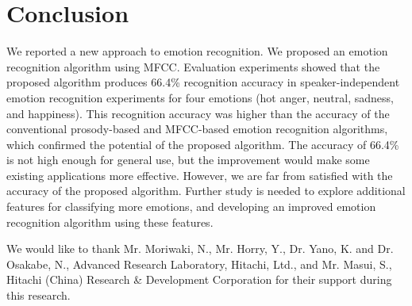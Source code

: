 \documentclass[english]{jnlp_1.3e}
\begin{document}
\section{Conclusion}

We reported a new approach to emotion recognition. We proposed an emotion recognition algorithm using MFCC. Evaluation experiments showed that the proposed algorithm produces 66.4\% recognition accuracy in speaker-independent emotion recognition experiments for four emotions (hot anger, neutral, sadness, and happiness). This recognition accuracy was higher than the accuracy of the conventional prosody-based and MFCC-based emotion recognition algorithms, which confirmed the potential of the proposed algorithm. The accuracy of 66.4\% is not high enough for general use, but the improvement would make some existing applications more effective. However, we are far from satisfied with the accuracy of the proposed algorithm. Further study is needed to explore additional features for classifying more emotions, and developing an improved emotion recognition algorithm using these features.






\acknowledgment

We would like to thank Mr. Moriwaki, N., Mr. Horry, Y., Dr. Yano, K. 
\pagebreak
and Dr. Osakabe, N., Advanced Research Laboratory, Hitachi, Ltd., and Mr. Masui, 
S., Hitachi (China) Research \& Development Corporation for their support during this research.
\end{document}
